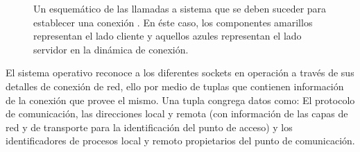 \begin{figure}[h!]
	\centering
	\hspace*{\fill}
	\hfill
	\caption{Un esquemático de las llamadas a sistema que se deben suceder para establecer una conexión \cite{book:sockets}. En éste caso, los componentes amarillos representan el lado cliente y aquellos azules representan el lado servidor en la dinámica de conexión.}
	\label{fig:socketHandshake}
	\hspace*{\fill}
\end{figure}

El sistema operativo reconoce a los diferentes sockets en operación a través de sus detalles de conexión de red, ello por medio de tuplas que contienen información de la conexión que provee el mismo. Una tupla congrega datos como: El protocolo de comunicación, las direcciones local y remota (con información de las capas de red y de transporte para la identificación del punto de acceso) y los identificadores de procesos local y remoto propietarios del punto de comunicación.

